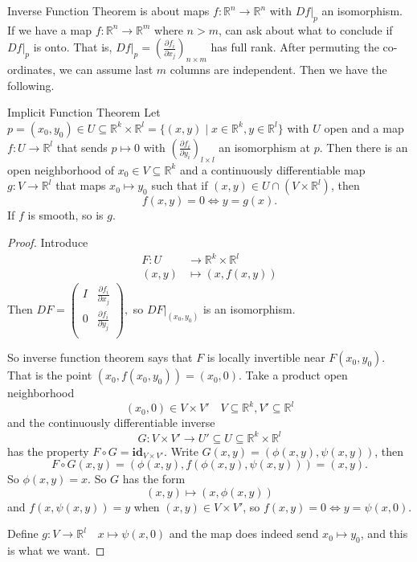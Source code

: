 Inverse Function Theorem is about maps \(f: \mathbb{R}^n \to \mathbb{R}^n\) with \(\left.Df\right|_p\) an isomorphism. If we have a map \(f: \mathbb{R}^n \to \mathbb{R}^m\) where \(n > m\), can ask about what to conclude if \(\left. Df\right|_p\) is onto. That is, \(\left. Df\right|_p = (\frac{\partial f_i}{\partial x_j})_{n\times m}\) has full rank. After permuting the co-ordinates, we can assume last \(m\) columns are independent. Then we have the following.
\begin{theorem}{Implicit Function Theorem}{}
    Let \(p = (x_0, y_0) \in U \subseteq \mathbb{R}^k \times \mathbb{R}^l = \{(x,y)\mid x\in \mathbb{R}^k, y\in \mathbb{R}^l\}\) with \(U\) open and a map \(f: U \to \mathbb{R}^l\) that sends \(p \mapsto 0\) with \((\frac{\partial f_i}{\partial y_i})_{l\times l}\) an isomorphism at \(p\). Then there is an open neighborhood of \(x_0 \in V \subseteq \mathbb{R}^k\) and a continuously differentiable map \(g: V \to \mathbb{R}^l\) that maps \(x_0 \mapsto y_0\) such that if \((x,y)\in U \cap (V\times \mathbb{R}^l)\), then
    \[
        f(x,y) = 0 \iff y = g(x).
    \]
    If \(f\) is smooth, so is \(g\).
\end{theorem}
\begin{proof}
    Introduce
    \begin{equation*}
    \begin{aligned}
      F\colon U & \longrightarrow \mathbb{R}^k \times \mathbb{R}^l\\
               (x,y) & \longmapsto (x, f(x,y))
    \end{aligned}
    \end{equation*}
    Then \(DF = \begin{pmatrix}
        I & \frac{\partial f_i}{\partial x_j}\\
        0 & \frac{\partial f_i}{\partial y_j}\\\end{pmatrix},\) so \(\left.DF\right|_{(x_0,y_0)}\) is an isomorphism.

        So inverse function theorem says that \(F\) is locally invertible near \(F(x_0, y_0)\). That is the point \((x_0, f(x_0, y_0)) = (x_0,0)\). Take a product open neighborhood
        \[
            (x_0, 0) \in V \times V' \quad V\subseteq \mathbb{R}^k, V' \subseteq \mathbb{R}^l
        \]
        and the continuously differentiable inverse
        \[
            G: V \times V' \to U' \subseteq U \subseteq \mathbb{R}^k \times \mathbb{R}^l
        \]
        has the property \(F \circ G = \textbf{id}_{V\times V'}\). Write \(G(x,y) = (\phi(x,y), \psi(x,y))\), then
        \[
            F\circ G(x, y) = (\phi(x,y), f(\phi(x,y), \psi(x,y))) = (x,y).
        \]
        So \(\phi(x,y) = x\). So \(G\) has the form
        \[
            (x,y)\mapsto (x, \phi(x,y))
        \]
        and \(f(x, \psi(x, y)) = y\) when \((x,y) \in V \times V'\), so \(f(x,y) = 0 \iff y = \psi(x,0)\).
        
        Define \(g: V \to \mathbb{R}^l\quad x \mapsto \psi(x, 0)\) and the map does indeed send \(x_0 \mapsto y_0\), and this is what we want.
\end{proof}
